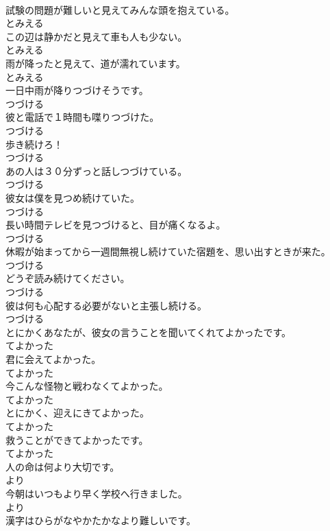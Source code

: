 \documentclass[8pt]{extreport}
\begin{document}
\begin{CJK}{UTF8}{min}
\\	試験の問題が難しいと見えてみんな頭を抱えている。	
\\	とみえる
\\	この辺は静かだと見えて車も人も少ない。	
\\	とみえる
\\	雨が降ったと見えて、道が濡れています。	
\\	とみえる
\\	一日中雨が降りつづけそうです。	
\\	つづける
\\	彼と電話で１時間も喋りつづけた。	
\\	つづける
\\	歩き続けろ！	
\\	つづける
\\	あの人は３０分ずっと話しつづけている。	
\\	つづける
\\	彼女は僕を見つめ続けていた。	
\\	つづける
\\	長い時間テレビを見つづけると、目が痛くなるよ。	
\\	つづける
\\	休暇が始まってから一週間無視し続けていた宿題を、思い出すときが来た。	
\\	つづける
\\	どうぞ読み続けてください。	
\\	つづける
\\	彼は何も心配する必要がないと主張し続ける。	
\\	つづける
\\	とにかくあなたが、彼女の言うことを聞いてくれてよかったです。	
\\	てよかった
\\	君に会えてよかった。	
\\	てよかった
\\	今こんな怪物と戦わなくてよかった。	
\\	てよかった
\\	とにかく、迎えにきてよかった。	
\\	てよかった
\\	救うことができてよかったです。	
\\	てよかった
\\	人の命は何より大切です。	
\\	より
\\	今朝はいつもより早く学校へ行きました。	
\\	より
\\	漢字はひらがなやかたかなより難しいです。	

\end{CJK}
\end{document}
